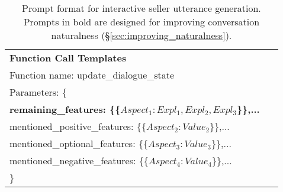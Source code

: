 \begin{table*}[t]
\begin{center}
\begin{tabular}{p{0.95\linewidth} }
    \hdashline
    \textbf{Function Call Templates} \\
    Function name: update\_dialogue\_state \\
    Parameters: \{ \\
    \hspace{1cm} \textbf{remaining\_features: \{\{$Aspect_1: Expl_1, Expl_2, Expl_3$\}\},...} \\
    \hspace{1cm} mentioned\_positive\_features: \{\{\textit{$Aspect_2: Value_2$}\}\},... \\
    \hspace{1cm} mentioned\_optional\_features: \{\{\textit{$Aspect_3: Value_3$}\}\},... \\
    \hspace{1cm} mentioned\_negative\_features: \{\{\textit{$Aspect_4: Value_4$}\}\},... \\
    \}\\
\hline
    \end{tabular}
    \caption{Prompt format for interactive seller utterance generation. Prompts in bold are designed for improving conversation naturalness (\S\ref{sec:improving_naturalness}).} \label{tab:seller_prompt}
\end{center}
\end{table*}

